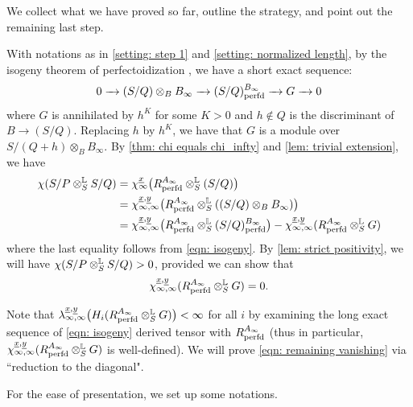 \documentclass[12pt]{amsart}
\numberwithin{equation}{theorem}
\numberwithin{equation}{theorem}
\newcommand{\perfd}{\textnormal{perfd}}
\begin{document}
We collect what we have proved so far, outline the strategy, and point out the remaining last step.

\begin{discussion}
\label{discuss: strategy of proof}
With notations as in \autoref{setting: step 1} and \autoref{setting: normalized length}, by the isogeny theorem of perfectoidization \cite[Proposition 2.4.7]{CaiLeeMaSchwedeTuckerPerfdSignature2026}, we have a short exact sequence:
\begin{equation}
\label{eqn: isogeny}
0 \to (S/Q)\otimes_BB_\infty \to (S/Q)^{B_\infty}_\perfd \to G \to 0
\end{equation}
where $G$ is annihilated by $h^K$ for some $K>0$ and $h\notin Q$ is the discriminant of $B\to (S/Q)$. Replacing $h$ by $h^K$, we have that $G$ is a module over $S/(Q+h) \otimes_BB_\infty$. By \autoref{thm: chi equals chi_infty} and \autoref{lem: trivial extension}, we have 
\begin{align*}
\chi(S/P\otimes^\myL_SS/Q) & = \chi_\infty^{\underline{x}}\big(R^{A_\infty}_\perfd \otimes^\myL_S(S/Q)\big) \\
& =\chi_{\infty,\infty}^{\underline{x},\underline{y}}\big(R^{A_\infty}_\perfd \otimes^\myL_S((S/Q)\otimes_BB_\infty)\big) \\
&  =  \chi_{\infty, \infty}^{\underline{x}, \underline{y}}\big(R^{A_\infty}_\perfd \otimes^\myL_S(S/Q)^{B_\infty}_\perfd\big) - \chi_{\infty, \infty}^{\underline{x}, \underline{y}}(R^{A_\infty}_\perfd \otimes^\myL_SG)
\end{align*}
where the last equality follows from \autoref{eqn: isogeny}. By \autoref{lem: strict positivity}, we will have $\chi(S/P\otimes^{\mathbb{L}}_SS/Q)>0$, provided we can show that
\begin{equation}
\label{eqn: remaining vanishing}
\chi_{\infty, \infty}^{\underline{x}, \underline{y}}(R^{A_\infty}_\perfd \otimes^\myL_SG) =0.
\end{equation}

Note that  $\lambda_{\infty,\infty}^{\underline{x},\underline{y}}\big(H_i(R^{A_\infty}_\perfd \otimes^\myL_SG)\big)<\infty$ for all $i$ by examining the long exact sequence of \autoref{eqn: isogeny} derived tensor with $R^{A_\infty}_\perfd$ (thus in particular, $\chi_{\infty, \infty}^{\underline{x}, \underline{y}}(R^{A_\infty}_\perfd \otimes^\myL_SG)$ is well-defined). We will prove \autoref{eqn: remaining vanishing} via ``reduction to the diagonal".
\end{discussion}


For the ease of presentation, we set up some notations.
\end{document}

